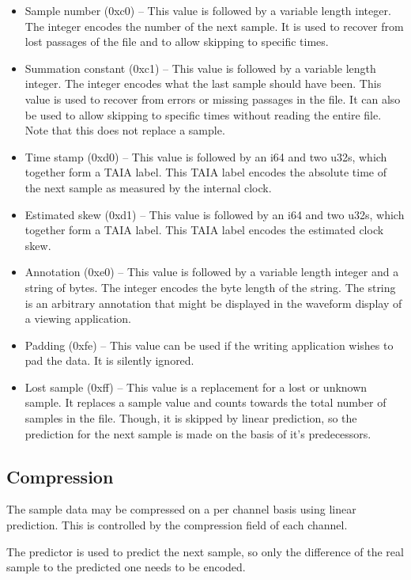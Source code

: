 \documentclass[DIV=10]{scrartcl}
\begin{document}
\begin{itemize}
  \item Sample number (0xc0) – This value is followed by a variable length integer.
  The integer encodes the number of the next sample.
  It is used to recover from lost passages of the file and to allow skipping to specific times.
  \item Summation constant (0xc1) – This value is followed by a variable length integer.
  The integer encodes what the last sample should have been.
  This value is used to recover from errors or missing passages in the file.
  It can also be used to allow skipping to specific times without reading the entire file.
  Note that this does not replace a sample.
  \item Time stamp (0xd0) – This value is followed by an i64 and two u32s, which together form a TAIA label.
  This TAIA label encodes the absolute time of the next sample as measured by the internal clock.
  \item Estimated skew (0xd1) – This value is followed by an i64 and two u32s, which together form a TAIA label.
  This TAIA label encodes the estimated clock skew.
  \item Annotation (0xe0) – This value is followed by a variable length integer and a string of bytes.
  The integer encodes the byte length of the string.
  The string is an arbitrary annotation that might be displayed in the waveform display of a viewing application.
  \item Padding (0xfe) – This value can be used if the writing application wishes to pad the data.
  It is silently ignored.
  \item Lost sample (0xff) – This value is a replacement for a lost or unknown sample.
  It replaces a sample value and counts towards the total number of samples in the file.
  Though, it is skipped by linear prediction, so the prediction for the next sample is made on the basis of it’s predecessors.
\end{itemize}

\subsection{Compression}
\label{compression}

The sample data may be compressed on a per channel basis using linear prediction.
This is controlled by the compression field of each channel.

The predictor is used to predict the next sample, so only the difference of the real sample to the predicted one needs to be encoded.
\end{document}
